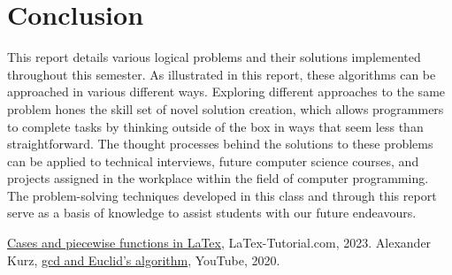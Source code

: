 \documentclass{article}
\theoremstyle{theorem}
\theoremstyle{definition}
\theoremstyle{remark}
\begin{document}
\section{Conclusion}\label{conclusions}

This report details various logical problems and their solutions implemented throughout this semester. As illustrated in this report, these algorithms can be approached in various different ways. Exploring different approaches to the same problem hones the skill set of novel solution creation, which allows programmers to complete tasks by thinking outside of the box in ways that seem less than straightforward. The thought processes behind the solutions to these problems can be applied to technical interviews, future computer science courses, and projects assigned in the workplace within the field of computer programming. The problem-solving techniques developed in this class and through this report serve as a basis of knowledge to assist students with our future endeavours. 

\begin{thebibliography}{99}
 \href{https://latex-tutorial.com/piecewise-functions-latex/}{Cases and piecewise functions in LaTex}, LaTex-Tutorial.com, 2023.
 Alexander Kurz, \href{https://www.youtube.com/watch?v=ZcJMj0antos}{gcd and Euclid's algorithm}, YouTube, 2020.
\end{thebibliography}
\end{document}
